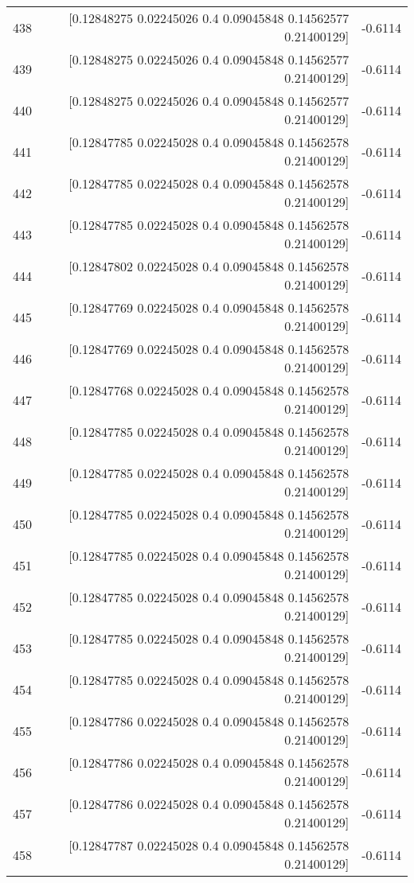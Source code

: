 \begin{longtable}{lrr}
438 & [0.12848275 0.02245026 0.4        0.09045848 0.14562577 0.21400129] & -0.6114 \\
439 & [0.12848275 0.02245026 0.4        0.09045848 0.14562577 0.21400129] & -0.6114 \\
440 & [0.12848275 0.02245026 0.4        0.09045848 0.14562577 0.21400129] & -0.6114 \\
441 & [0.12847785 0.02245028 0.4        0.09045848 0.14562578 0.21400129] & -0.6114 \\
442 & [0.12847785 0.02245028 0.4        0.09045848 0.14562578 0.21400129] & -0.6114 \\
443 & [0.12847785 0.02245028 0.4        0.09045848 0.14562578 0.21400129] & -0.6114 \\
444 & [0.12847802 0.02245028 0.4        0.09045848 0.14562578 0.21400129] & -0.6114 \\
445 & [0.12847769 0.02245028 0.4        0.09045848 0.14562578 0.21400129] & -0.6114 \\
446 & [0.12847769 0.02245028 0.4        0.09045848 0.14562578 0.21400129] & -0.6114 \\
447 & [0.12847768 0.02245028 0.4        0.09045848 0.14562578 0.21400129] & -0.6114 \\
448 & [0.12847785 0.02245028 0.4        0.09045848 0.14562578 0.21400129] & -0.6114 \\
449 & [0.12847785 0.02245028 0.4        0.09045848 0.14562578 0.21400129] & -0.6114 \\
450 & [0.12847785 0.02245028 0.4        0.09045848 0.14562578 0.21400129] & -0.6114 \\
451 & [0.12847785 0.02245028 0.4        0.09045848 0.14562578 0.21400129] & -0.6114 \\
452 & [0.12847785 0.02245028 0.4        0.09045848 0.14562578 0.21400129] & -0.6114 \\
453 & [0.12847785 0.02245028 0.4        0.09045848 0.14562578 0.21400129] & -0.6114 \\
454 & [0.12847785 0.02245028 0.4        0.09045848 0.14562578 0.21400129] & -0.6114 \\
455 & [0.12847786 0.02245028 0.4        0.09045848 0.14562578 0.21400129] & -0.6114 \\
456 & [0.12847786 0.02245028 0.4        0.09045848 0.14562578 0.21400129] & -0.6114 \\
457 & [0.12847786 0.02245028 0.4        0.09045848 0.14562578 0.21400129] & -0.6114 \\
458 & [0.12847787 0.02245028 0.4        0.09045848 0.14562578 0.21400129] & -0.6114 \\

\end{longtable}
